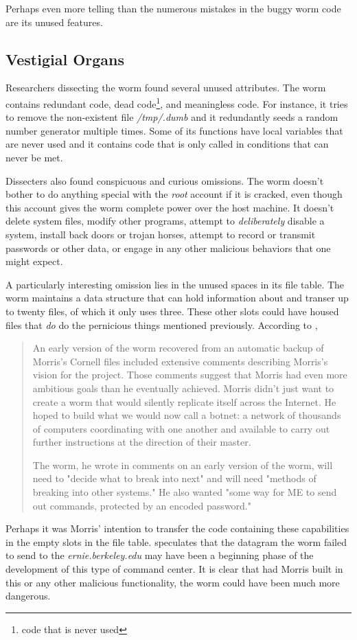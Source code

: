 Perhaps even more telling than the numerous mistakes in the buggy worm code
are its unused features.


\subsection*{Vestigial Organs}

Researchers dissecting the worm found several
unused attributes. The worm contains redundant code, dead code\footnote{code
that is never used}, and meaningless code. For instance, it tries to remove the
non-existent file \textit{/tmp/.dumb} and it redundantly seeds a random number
generator multiple times. Some of its functions have local variables that are
never used and it contains code that is only called in conditions that can
never be met. 

Dissecters also found conspicuous and curious omissions. The worm doesn't bother
to do anything special with the \textit{root} account if it is cracked, even
though this account gives the worm complete power over the host machine.
It doesn't delete system files, modify other programs, attempt to
\textit{deliberately} disable a system, install back doors or trojan horses,
attempt to record or transmit passwords or other data, or engage in any other
malicious behaviors that one might expect. 

A particularly interesting omission lies in the unused spaces in its file table.
The worm maintains a data structure that can hold information about and transer
up to twenty files, of which it only uses three. These other slots could have
housed files that \textit{do} do the pernicious things
mentioned previously. According to \cite{lee_washpost_2013},

\begin{quote}
An early version of the worm recovered from an automatic backup of Morris's
Cornell files included extensive comments describing Morris's vision for the
project. Those comments suggest that Morris had even more ambitious goals than
he eventually achieved. Morris didn't just want to create a worm that would
silently replicate itself across the Internet. He hoped to build what we would
now call a botnet: a network of thousands of computers coordinating with one
another and available to carry out further instructions at the direction of
their master.

The worm, he wrote in comments on an early version of the worm, will need to
"decide what to break into next" and will need "methods of breaking into other
systems." He also wanted "some way for ME to send out commands, protected by an
encoded password."
\end{quote}

Perhaps it was Morris' intention to transfer the code containing these
capabilities in the empty slots in the file table. \cite{lee_washpost_2013}
speculates that the datagram the worm failed to send to the 
\textit{ernie.berkeley.edu} may have been a beginning phase of the development
of this type of command center. It is clear that had Morris built in this or
any other malicious functionality, the worm could have been much more dangerous.

